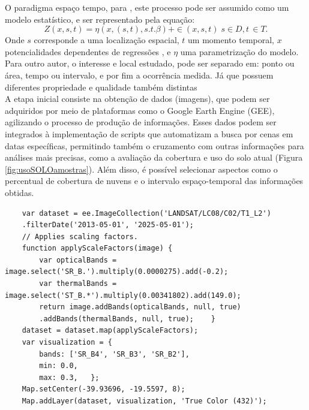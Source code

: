   \hspace*{1.25 cm} O paradigma espaço tempo, para \cite[p.2]{mateu}, este processo pode ser assumido como um modelo estatístico, e ser representado pela equação:
  \begin{equation}
  	 Z(x,s,t) =  \eta ( x,(s,t), s.t.\beta) + \in (x,s,t)  \; s \in D, t \, \in T.  
  \end{equation}
  \hspace*{1.25 cm}   Onde $s$ corresponde a uma localização espacial, $t$ um momento temporal, $x$ potencialidades  dependentes de regressões , e $ \eta $ uma parametrização do modelo.\\
   \hspace*{1.25 cm} Para outro autor,  \cite[p.151]{Bivand} o interesse e local estudado, pode ser separado em: ponto ou área, tempo ou intervalo, e por fim a ocorrência medida. Já que possuem diferentes  propriedade e qualidade também distintas  \\
  \hspace*{1.25 cm} A etapa inicial consiste na obtenção de dados (imagens), que podem ser adquiridos por meio de plataformas como o Google Earth Engine (GEE), agilizando o processo de produção de informações. Esses dados podem ser integrados à implementação de scripts que automatizam a busca por cenas em datas específicas, permitindo também o cruzamento com outras informações para análises mais precisas, como a avaliação da cobertura e uso do solo atual (Figura \ref{fig:usoSOLOamostras}). Além disso, é possível selecionar aspectos como o percentual de cobertura de nuvens e o intervalo espaço-temporal das informações obtidas.
  \lstset{
  	language=Java, %
  	caption=Código de obtenção de imagens multiespectrais Landsat8 plataforma Google Earth Engine Code\, em linguagem JavaScript.,} %
  
  \begin{lstlisting}
  	var dataset = ee.ImageCollection('LANDSAT/LC08/C02/T1_L2')
  	.filterDate('2013-05-01', '2025-05-01');
  	// Applies scaling factors.
  	function applyScaleFactors(image) {
  		var opticalBands = image.select('SR_B.').multiply(0.0000275).add(-0.2);
  		var thermalBands = image.select('ST_B.*').multiply(0.00341802).add(149.0);
  		return image.addBands(opticalBands, null, true)
  		.addBands(thermalBands, null, true);   	}
  	dataset = dataset.map(applyScaleFactors);
  	var visualization = {
  		bands: ['SR_B4', 'SR_B3', 'SR_B2'],
  		min: 0.0,
  		max: 0.3,  	};
  	Map.setCenter(-39.93696, -19.5597, 8);
  	Map.addLayer(dataset, visualization, 'True Color (432)');
  \end{lstlisting}
